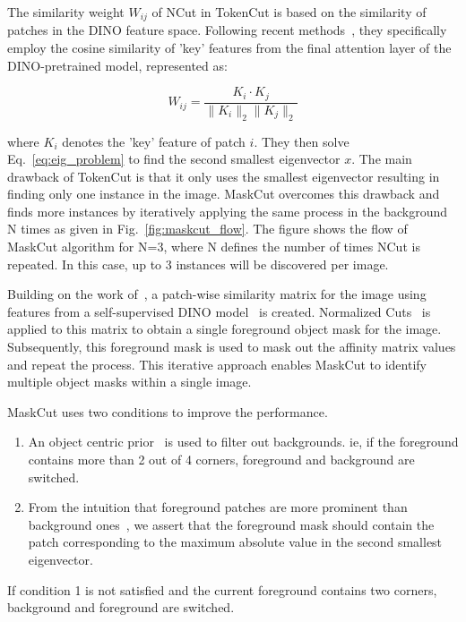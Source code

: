 The similarity weight \( W_{ij} \) of NCut in TokenCut is based on the similarity of patches in the DINO feature space. Following recent methods~\cite{simeoni2021localizingobjectsselfsupervisedtransformers, vangansbeke2022discoveringobjectmaskstransformers, wang2023tokencutsegmentingobjectsimages}, they specifically employ the cosine similarity of 'key' features from the final attention layer of the DINO-pretrained model, represented as:

\begin{equation}
W_{ij} = \frac{K_i \cdot K_j}{\|K_i\|_2 \|K_j\|_2}
\end{equation}

where \( K_i \) denotes the 'key' feature of patch \( i \). They then solve Eq.~\ref{eq:eig_problem} to find the second smallest eigenvector \( x \). The main drawback of TokenCut is that it only uses the smallest eigenvector resulting in finding only one instance in the image. MaskCut overcomes this drawback and finds more instances by iteratively applying the same process in the background N times as given in Fig.~\ref{fig:maskcut_flow}. The figure shows the flow of MaskCut algorithm for N=3, where N defines the number of times NCut is repeated. In this case, up to 3 instances will be discovered per image.

Building on the work of~\cite{wang2023tokencutsegmentingobjectsimages, caron2021emergingpropertiesselfsupervisedvision}, a patch-wise similarity matrix for the image using features from a self-supervised DINO model~\cite{caron2021emerging} is created. Normalized Cuts~\cite{normcut} is applied to this matrix to obtain a single foreground object mask for the image. Subsequently, this foreground mask is used to mask out the affinity matrix values and repeat the process. This iterative approach enables MaskCut to identify multiple object masks within a single image.

MaskCut uses two conditions to improve the performance.
\begin{enumerate}
	\item An object centric prior~\cite{obj_centric_prior} is used to filter out backgrounds. ie, if the foreground contains more than 2 out of 4 corners, foreground and background are switched.
	
	\item From the intuition that foreground patches are more prominent than background ones~\cite{caron2021emergingpropertiesselfsupervisedvision, cond1_support_2}, we assert that the foreground mask should contain the patch corresponding to the maximum absolute value in the second smallest eigenvector.
\end{enumerate}
  If condition 1 is not satisfied and the current foreground contains two corners, background and foreground are switched.


